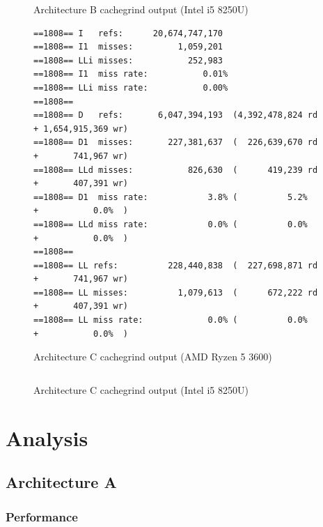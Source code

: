 \documentclass{article}
\begin{document}
\begin{figure}[!h]
\centering
\begin{BVerbatim}
\end{BVerbatim}
\caption{Architecture B cachegrind output (Intel i5 8250U)}
\label{arch_b_cachegrind_laptop}
\end{figure}

\begin{figure}[!h]
\centering
\begin{BVerbatim}
==1808== I   refs:      20,674,747,170
==1808== I1  misses:         1,059,201
==1808== LLi misses:           252,983
==1808== I1  miss rate:           0.01%
==1808== LLi miss rate:           0.00%
==1808== 
==1808== D   refs:       6,047,394,193  (4,392,478,824 rd   + 1,654,915,369 wr)
==1808== D1  misses:       227,381,637  (  226,639,670 rd   +       741,967 wr)
==1808== LLd misses:           826,630  (      419,239 rd   +       407,391 wr)
==1808== D1  miss rate:            3.8% (          5.2%     +           0.0%  )
==1808== LLd miss rate:            0.0% (          0.0%     +           0.0%  )
==1808== 
==1808== LL refs:          228,440,838  (  227,698,871 rd   +       741,967 wr)
==1808== LL misses:          1,079,613  (      672,222 rd   +       407,391 wr)
==1808== LL miss rate:             0.0% (          0.0%     +           0.0%  )
\end{BVerbatim}
\caption{Architecture C cachegrind output (AMD Ryzen 5 3600)}
\label{arch_c_cachegrind_pc}
\end{figure}

\begin{figure}[!h]
\centering
\begin{BVerbatim}
\end{BVerbatim}
\caption{Architecture C cachegrind output (Intel i5 8250U)}
\label{arch_c_cachegrind_laptop}
\end{figure}

\clearpage

\section{Analysis}
\subsection{Architecture A}
\subsubsection{Performance}
\end{document}
